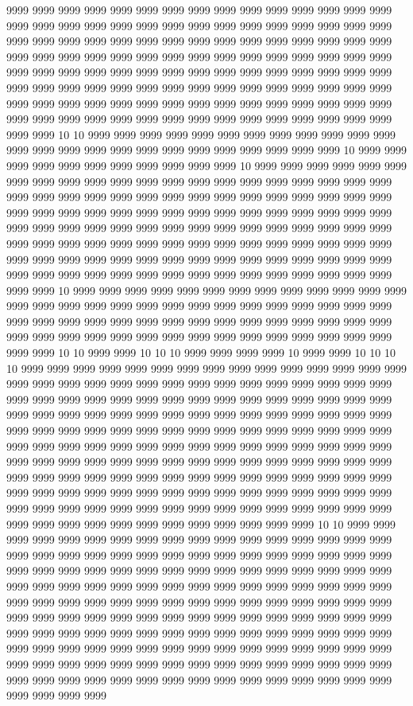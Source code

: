 9999 9999 9999 9999 9999 9999 9999 9999 9999 9999 9999 9999 9999 9999 9999 9999 9999 9999 9999 9999 9999 9999 9999 9999 9999 9999 9999 9999 9999 9999 9999 9999 9999 9999 9999 9999 9999 9999 9999 9999 9999 9999 9999 9999 9999 9999 9999 9999 9999 9999 9999 9999 9999 9999 9999 9999 9999 9999 9999 9999 9999 9999 9999 9999 9999 9999 9999 9999 9999 9999 9999 9999 9999 9999 9999 9999 9999 9999 9999 9999 9999 9999 9999 9999 9999 9999 9999 9999 9999 9999 9999 9999 9999 9999 9999 9999 9999 9999 9999 9999 9999 9999 9999 9999 9999 9999 9999 9999 9999 9999 9999 9999 9999 9999 9999 9999 9999 9999 9999 9999 9999 9999 10 10 9999 9999 9999 9999 9999 9999 9999 9999 9999 9999 9999 9999 9999 9999 9999 9999 9999 9999 9999 9999 9999 9999 9999 9999 9999 10 9999 9999 9999 9999 9999 9999 9999 9999 9999 9999 9999 10 9999 9999 9999 9999 9999 9999 9999 9999 9999 9999 9999 9999 9999 9999 9999 9999 9999 9999 9999 9999 9999 9999 9999 9999 9999 9999 9999 9999 9999 9999 9999 9999 9999 9999 9999 9999 9999 9999 9999 9999 9999 9999 9999 9999 9999 9999 9999 9999 9999 9999 9999 9999 9999 9999 9999 9999 9999 9999 9999 9999 9999 9999 9999 9999 9999 9999 9999 9999 9999 9999 9999 9999 9999 9999 9999 9999 9999 9999 9999 9999 9999 9999 9999 9999 9999 9999 9999 9999 9999 9999 9999 9999 9999 9999 9999 9999 9999 9999 9999 9999 9999 9999 9999 9999 9999 9999 9999 9999 9999 9999 9999 9999 9999 10 9999 9999 9999 9999 9999 9999 9999 9999 9999 9999 9999 9999 9999 9999 9999 9999 9999 9999 9999 9999 9999 9999 9999 9999 9999 9999 9999 9999 9999 9999 9999 9999 9999 9999 9999 9999 9999 9999 9999 9999 9999 9999 9999 9999 9999 9999 9999 9999 9999 9999 9999 9999 9999 9999 9999 9999 9999 9999 9999 9999 10 10 9999 9999 10 10 10 9999 9999 9999 9999 10 9999 9999 10 10 10 10 9999 9999 9999 9999 9999 9999 9999 9999 9999 9999 9999 9999 9999 9999 9999 9999 9999 9999 9999 9999 9999 9999 9999 9999 9999 9999 9999 9999 9999 9999 9999 9999 9999 9999 9999 9999 9999 9999 9999 9999 9999 9999 9999 9999 9999 9999 9999 9999 9999 9999 9999 9999 9999 9999 9999 9999 9999 9999 9999 9999 9999 9999 9999 9999 9999 9999 9999 9999 9999 9999 9999 9999 9999 9999 9999 9999 9999 9999 9999 9999 9999 9999 9999 9999 9999 9999 9999 9999 9999 9999 9999 9999 9999 9999 9999 9999 9999 9999 9999 9999 9999 9999 9999 9999 9999 9999 9999 9999 9999 9999 9999 9999 9999 9999 9999 9999 9999 9999 9999 9999 9999 9999 9999 9999 9999 9999 9999 9999 9999 9999 9999 9999 9999 9999 9999 9999 9999 9999 9999 9999 9999 9999 9999 9999 9999 9999 9999 9999 9999 9999 9999 9999 9999 9999 9999 9999 9999 9999 9999 9999 9999 9999 10 10 9999 9999 9999 9999 9999 9999 9999 9999 9999 9999 9999 9999 9999 9999 9999 9999 9999 9999 9999 9999 9999 9999 9999 9999 9999 9999 9999 9999 9999 9999 9999 9999 9999 9999 9999 9999 9999 9999 9999 9999 9999 9999 9999 9999 9999 9999 9999 9999 9999 9999 9999 9999 9999 9999 9999 9999 9999 9999 9999 9999 9999 9999 9999 9999 9999 9999 9999 9999 9999 9999 9999 9999 9999 9999 9999 9999 9999 9999 9999 9999 9999 9999 9999 9999 9999 9999 9999 9999 9999 9999 9999 9999 9999 9999 9999 9999 9999 9999 9999 9999 9999 9999 9999 9999 9999 9999 9999 9999 9999 9999 9999 9999 9999 9999 9999 9999 9999 9999 9999 9999 9999 9999 9999 9999 9999 9999 9999 9999 9999 9999 9999 9999 9999 9999 9999 9999 9999 9999 9999 9999 9999 9999 9999 9999 9999 9999 9999 9999 9999 9999 9999 9999 9999 9999 9999 9999 